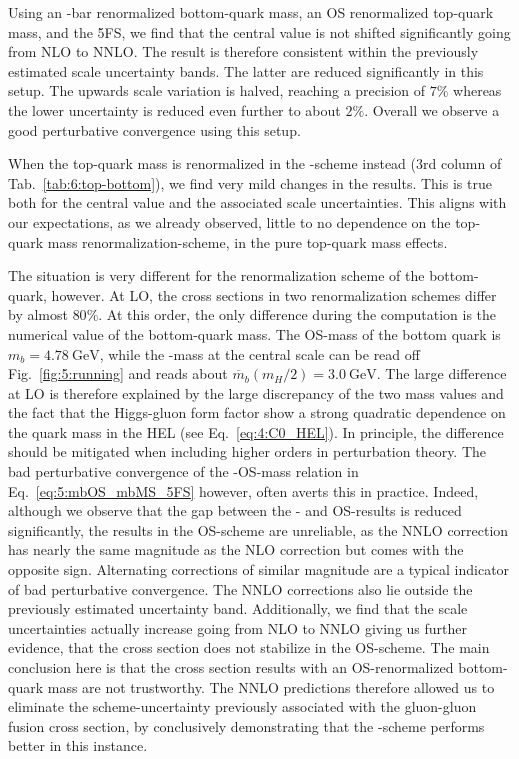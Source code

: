 Using an \MS-bar renormalized bottom-quark mass, an \acs{OS} renormalized top-quark mass, and the 5\acs{FS}, we find that the central value is not shifted significantly going from \acs{NLO} to \acs{NNLO}. The result is therefore consistent within the previously estimated scale uncertainty bands. The latter are reduced significantly in this setup. The upwards scale variation is halved, reaching a precision of $7\%$ whereas the lower uncertainty is reduced even further to about $2\%$. Overall we observe a good perturbative convergence using this setup.

When the top-quark mass is renormalized in the \MS-scheme instead (3rd column of Tab.~\ref{tab:6:top-bottom}), we find very mild changes in the results. This is true both for the central value and the associated scale uncertainties. This aligns with our expectations, as we already observed, little to no dependence on the top-quark mass renormalization-scheme, in the pure top-quark mass effects.

The situation is very different for the renormalization scheme of the bottom-quark, however. At \acs{LO}, the cross sections in two renormalization schemes differ by almost $80\%$. At this order, the only difference during the computation is the numerical value of the bottom-quark mass. The \acs{OS}-mass of the bottom quark is $m_b = 4.78\ \text{GeV}$, while the \MS-mass at the central scale can be read off Fig.~\ref{fig:5:running} and reads about $\overline{m}_b(m_H/2) = 3.0\ \text{GeV}$. The large difference at \acs{LO} is therefore explained by the large discrepancy of the two mass values and the fact that the Higgs-gluon form factor show a strong quadratic dependence on the quark mass in the \acs{HEL} (see Eq.~\eqref{eq:4:C0_HEL}). In principle, the difference should be mitigated when including higher orders in perturbation theory. The bad perturbative convergence of the \MS-\acs{OS}-mass relation in Eq.~\eqref{eq:5:mbOS_mbMS_5FS} however, often averts this in practice. Indeed, although we observe that the gap between the \MS- and \acs{OS}-results is reduced significantly, the results in the \acs{OS}-scheme are unreliable, as the \acs{NNLO} correction has nearly the same magnitude as the \acs{NLO} correction but comes with the opposite sign. Alternating corrections of similar magnitude are a typical indicator of bad perturbative convergence. The \acs{NNLO} corrections also lie outside the previously estimated uncertainty band. Additionally, we find that the scale uncertainties actually increase going from \acs{NLO} to \acs{NNLO} giving us further evidence, that the cross section does not stabilize in the \acs{OS}-scheme. The main conclusion here is that the cross section results with an \acs{OS}-renormalized bottom-quark mass are not trustworthy. The \acs{NNLO} predictions therefore allowed us to eliminate the scheme-uncertainty previously associated with the gluon-gluon fusion cross section, by conclusively demonstrating that the \MS-scheme performs better in this instance.

